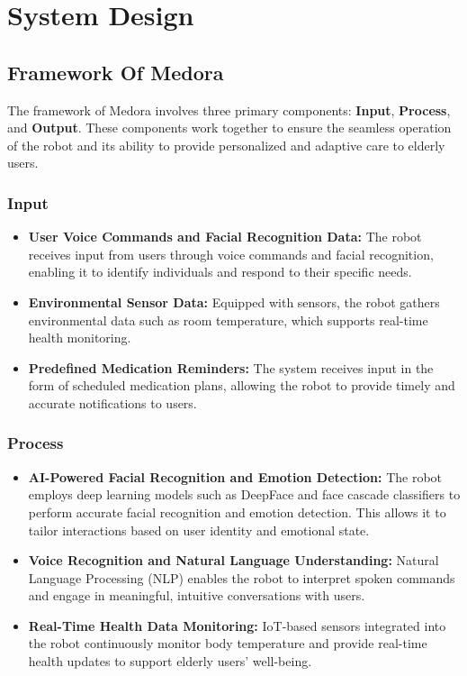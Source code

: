 \chapter{System Design}


\section{Framework Of Medora}
\label{sec:Framework of Medora}
The framework of Medora involves three primary components: \textbf{Input}, \textbf{Process}, and \textbf{Output}. These components work together to ensure the seamless operation of the robot and its ability to provide personalized and adaptive care to elderly users.

\subsection*{Input}

\begin{itemize}
    \item \textbf{User Voice Commands and Facial Recognition Data:} The robot receives input from users through voice commands and facial recognition, enabling it to identify individuals and respond to their specific needs.
    
    \item \textbf{Environmental Sensor Data:} Equipped with sensors, the robot gathers environmental data such as room temperature, which supports real-time health monitoring.
    
    \item \textbf{Predefined Medication Reminders:} The system receives input in the form of scheduled medication plans, allowing the robot to provide timely and accurate notifications to users.
\end{itemize}

\subsection*{Process}

\begin{itemize}
    \item \textbf{AI-Powered Facial Recognition and Emotion Detection:} The robot employs deep learning models such as DeepFace and face cascade classifiers to perform accurate facial recognition and emotion detection. This allows it to tailor interactions based on user identity and emotional state.
    
    \item \textbf{Voice Recognition and Natural Language Understanding:} Natural Language Processing (NLP) enables the robot to interpret spoken commands and engage in meaningful, intuitive conversations with users.
    
    \item \textbf{Real-Time Health Data Monitoring:} IoT-based sensors integrated into the robot continuously monitor body temperature and provide real-time health updates to support elderly users' well-being.
\end{itemize}

